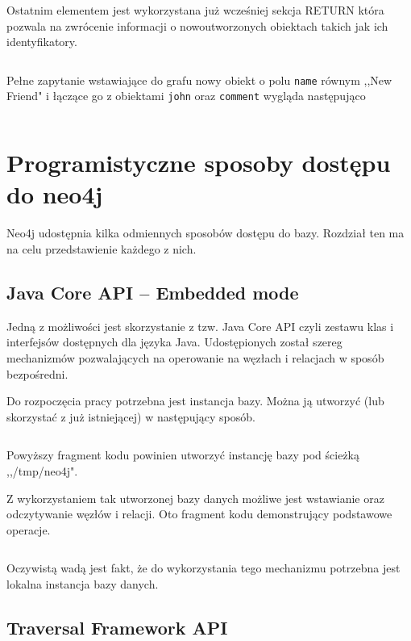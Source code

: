 \documentclass[brudnopis]{xmgr}
\begin{document}
\inputminted{cypher}{listings/cypher/create-section.cypher}

Ostatnim elementem jest wykorzystana już wcześniej sekcja RETURN która pozwala na zwrócenie informacji o nowoutworzonych obiektach takich jak ich identyfikatory.

\inputminted{cypher}{listings/cypher/return-section-2.cypher}

Pełne zapytanie wstawiające do grafu nowy obiekt o polu \texttt{name} równym ,,New Friend" i łączące go z obiektami \texttt{john} oraz \texttt{comment} wygląda następująco

\inputminted{cypher}{listings/cypher/sample-create-query.cypher}

\section{Programistyczne sposoby dostępu do neo4j}

Neo4j udostępnia kilka odmiennych sposobów dostępu do bazy. Rozdział ten ma na celu przedstawienie każdego z nich.

\subsection{Java Core API -- Embedded mode}

Jedną z możliwości jest skorzystanie z tzw. Java Core API czyli zestawu klas i interfejsów dostępnych dla języka Java. Udostępionych został szereg mechanizmów pozwalających na operowanie na węzłach i relacjach w sposób bezpośredni.

Do rozpoczęcia pracy potrzebna jest instancja bazy. Można ją utworzyć (lub skorzystać z już istniejącej) w następujący sposób.

\inputminted{java}{listings/java/neo4j-core-api-dbcreate.java}

Powyższy fragment kodu powinien utworzyć instancję bazy pod ścieżką ,,/tmp/neo4j".

Z wykorzystaniem tak utworzonej bazy danych możliwe jest wstawianie oraz odczytywanie węzłów i relacji. Oto fragment kodu demonstrujący podstawowe operacje.

\inputminted{java}{listings/java/neo4j-core-api-use.java}

Oczywistą wadą jest fakt, że do wykorzystania tego mechanizmu potrzebna jest lokalna instancja bazy danych.

\subsection{Traversal Framework API}
\end{document}
